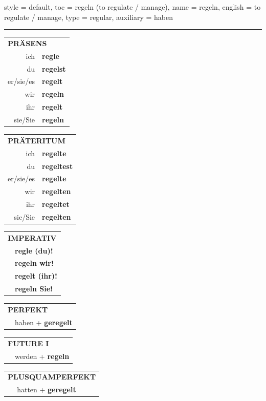 \begin{verbentry}{
  style = {default},
  toc = {regeln (to regulate / manage)},
  name = {regeln},
  english = {to regulate / manage},
  type = {regular},
  auxiliary = {haben}
}
 

\vspace{5pt}
\hrule
\vspace{5pt}

\begin{tabular}{rl}
\multicolumn{2}{l}{\textbf{PRÄSENS}}\\
ich & \textbf{regle}\\
du & \textbf{regelst}\\
er/sie/es & \textbf{regelt}\\
wir & \textbf{regeln}\\
ihr & \textbf{regelt}\\
sie/Sie & \textbf{regeln}\\
\end{tabular}
\hfill
\begin{tabular}{rl}
\multicolumn{2}{l}{\textbf{PRÄTERITUM}}\\
ich & \textbf{regelte}\\
du & \textbf{regeltest}\\
er/sie/es & \textbf{regelte}\\
wir & \textbf{regelten}\\
ihr & \textbf{regeltet}\\
sie/Sie & \textbf{regelten}\\
\end{tabular}
\hfill
\begin{tabular}{rl}
\multicolumn{2}{l}{\textbf{IMPERATIV}}\\
& \textbf{regle (du)!}\\
& \textbf{regeln wir!}\\
& \textbf{regelt (ihr)!}\\
& \textbf{regeln Sie!}\\
\end{tabular}

\vspace{10pt}

\begin{tabular}{rl}
\multicolumn{2}{l}{\textbf{PERFEKT}}\\
& haben + \textbf{geregelt}\\
\end{tabular}
\hfill
\begin{tabular}{rl}
\multicolumn{2}{l}{\textbf{FUTURE I}}\\
& werden + \textbf{regeln}\\
\end{tabular}
\hfill
\begin{tabular}{rl}
\multicolumn{2}{l}{\textbf{PLUSQUAMPERFEKT}}\\
& hatten + \textbf{geregelt}\\
\end{tabular}


\end{verbentry}
